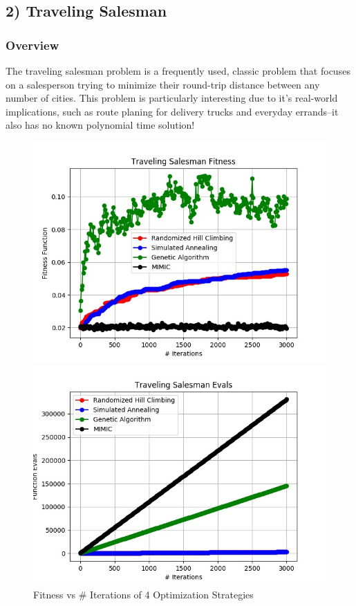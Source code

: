 \documentclass[h]{article}
\begin{document}
\subsection*{2) Traveling Salesman}  
\subsubsection*{Overview}
The traveling salesman problem is a frequently used, classic problem that focuses on a 
salesperson trying to minimize their round-trip distance between any number of cities.  This problem is particularly 
interesting  due to it's real-world implications, such as route planing for 
delivery trucks and everyday errands--it also has no known polynomial time 
solution!

 \begin{figure}[H]
      \includegraphics[width=1\textwidth,keepaspectratio]{traveling_salesman_fitness.jpg} 
      \caption*{Fitness vs # Iterations of 4 Optimization Strategies} 
   \endminipage\hfill
      \includegraphics[width=1\textwidth,keepaspectratio]{traveling_salesman_evals.jpg} 

\end{figure}
\end{document}
